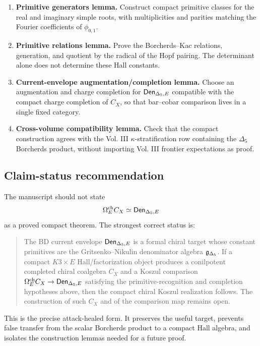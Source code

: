 \begin{enumerate}
\item \textbf{Primitive generators lemma.}
Construct compact primitive classes for the real and imaginary simple
roots, with multiplicities and parities matching the Fourier
coefficients of \(\phi_{0,1}\).

\item \textbf{Primitive relations lemma.}
Prove the Borcherds--Kac relations, generation, and quotient by the
radical of the Hopf pairing.  The determinant alone does not determine
these Hall constants.

\item \textbf{Current-envelope augmentation/completion lemma.}
Choose an augmentation and charge completion for \(\mathsf{Den}_{\Delta_5,E}\) compatible
with the compact charge completion of \(C_X\), so that bar--cobar
comparison lives in a single fixed category.

\item \textbf{Cross-volume compatibility lemma.}
Check that the compact construction agrees with the Vol. III
\(\kappa\)-stratification row containing the \(\Delta_5\) Borcherds
product, without importing Vol. III frontier expectations as proof.
\end{enumerate}

\subsection{Claim-status recommendation}

The manuscript should not state
\[
        \Omega^{\mathrm{ch}}_E C_X \simeq \mathsf{Den}_{\Delta_5,E}
\]
as a proved compact theorem.  The strongest correct status is:

\begin{quote}
The BD current envelope \(\mathsf{Den}_{\Delta_5,E}\) is a formal chiral target whose
constant primitives are the Gritsenko--Nikulin denominator algebra
\(\mathfrak g_{\Delta_5}\).  If a compact \(K3\times E\) Hall/factorization object
produces a conilpotent completed chiral coalgebra \(C_X\) and a Koszul
comparison \(\Omega^{\mathrm{ch}}_E C_X\to\mathsf{Den}_{\Delta_5,E}\) satisfying the primitive-recognition
and completion hypotheses above, then the compact chiral Koszul
realization follows.  The construction of such \(C_X\) and of the
comparison map remains open.
\end{quote}

This is the precise attack-healed form.  It preserves the useful
target, prevents false transfer from the scalar Borcherds product to a
compact Hall algebra, and isolates the construction lemmas needed for a
future proof.

